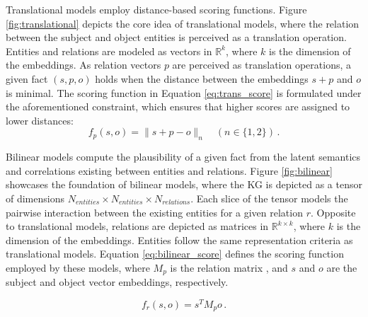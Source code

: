 Translational models employ distance-based scoring functions. Figure \ref{fig:translational} depicts the core idea of translational models, where the relation between the subject and object entities is perceived as a translation operation. Entities and relations are modeled as vectors in ${\mathbb{R}}^{k}$, where $k$ is the dimension of the embeddings. As relation vectors $p$ are perceived as translation operations, a given fact $(s,p,o)$ holds when the distance between the embeddings $s+p$ and $o$ is minimal. The scoring function in Equation \ref{eq:trans_score} is formulated under the aforementioned constraint, which ensures that higher scores are assigned to lower distances:
\begin{equation}\label{eq:trans_score}
    f_p(s,o)=\|s + p - o\|_n
    \quad
    ( n \in \{1,2\})\,.
\end{equation} 

Bilinear models compute the plausibility of a given fact from the latent semantics and correlations existing between entities and relations. Figure \ref{fig:bilinear} showcases the foundation of bilinear models, where the KG is depicted as a tensor of dimensions $N_{entities} \times N_{entities} \times N_{relations}$. Each slice of the tensor models the pairwise interaction between the existing entities for a given relation $r$. Opposite to translational models, relations are depicted as matrices in $\mathbb{R}^{k \times k}$, where $k$ is the dimension of the embeddings. Entities follow the same representation criteria as translational models. Equation \ref{eq:bilinear_score} defines the scoring function employed by these models, where $M_p$ is the relation matrix , and $s$ and $o$ are the subject and object vector embeddings, respectively.

\begin{equation}\label{eq:bilinear_score}
    f_r(s,o)=s^T M_p o \,.
\end{equation}





